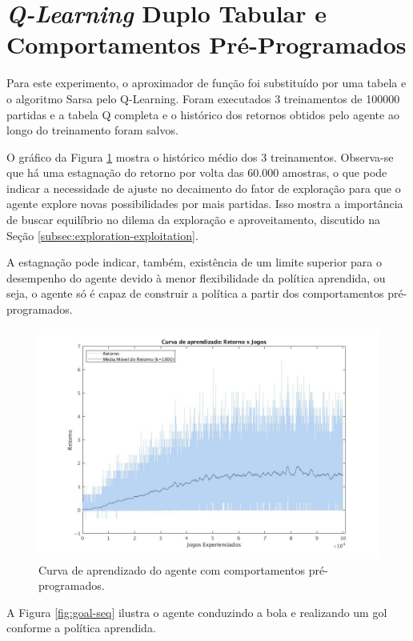 \section{\textit{Q-Learning} Duplo Tabular e Comportamentos Pré-Programados}
\label{sec:behaviors-tabular}

Para este experimento, o aproximador de função foi substituído por uma tabela e o algoritmo Sarsa pelo Q-Learning. Foram executados 3 treinamentos de 100000 partidas e a tabela Q completa e o histórico dos retornos obtidos pelo agente ao longo do treinamento foram salvos.

O gráfico da Figura \ref{fig:single-agent-tabular-behaviors} mostra o histórico médio dos 3 treinamentos.
Observa-se que há uma estagnação do retorno por volta das 60.000 amostras, o que pode indicar a necessidade de ajuste no decaimento do fator de exploração para que o agente explore novas possibilidades por mais partidas. Isso mostra a importância de buscar equilíbrio no dilema da exploração e aproveitamento, discutido na Seção \ref{subsec:exploration-exploitation}.

A estagnação pode indicar, também, existência de um limite superior para o desempenho do agente devido à menor flexibilidade da política aprendida, ou seja, o agente só é capaz de construir a política a partir dos comportamentos pré-programados.

\begin{figure}[H]
	\includegraphics[width=0.9\linewidth]{figs/curva-behaviors-tabular.jpg}
	\centering
	\caption{Curva de aprendizado do agente com comportamentos pré-programados.}
	\label{fig:single-agent-tabular-behaviors}
\end{figure}

A Figura \ref{fig:goal-seq} ilustra o agente conduzindo a bola e realizando um gol conforme a política aprendida.

